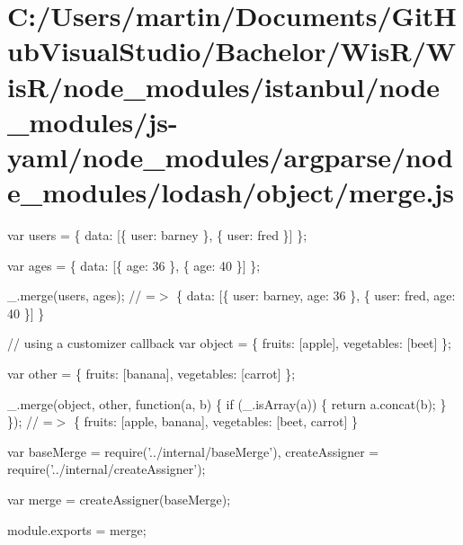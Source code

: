 \hypertarget{_c_1_2_users_2martin_2_documents_2_git_hub_visual_studio_2_bachelor_2_wis_r_2_wis_r_2node_modulebf1160bae7eb22fdbb16d729d621cb47}{}\section{C\+:/\+Users/martin/\+Documents/\+Git\+Hub\+Visual\+Studio/\+Bachelor/\+Wis\+R/\+Wis\+R/node\+\_\+modules/istanbul/node\+\_\+modules/js-\/yaml/node\+\_\+modules/argparse/node\+\_\+modules/lodash/object/merge.\+js}
var users = \{ \textquotesingle{}data\textquotesingle{}\+: \mbox{[}\{ \textquotesingle{}user\textquotesingle{}\+: \textquotesingle{}barney\textquotesingle{} \}, \{ \textquotesingle{}user\textquotesingle{}\+: \textquotesingle{}fred\textquotesingle{} \}\mbox{]} \};

var ages = \{ \textquotesingle{}data\textquotesingle{}\+: \mbox{[}\{ \textquotesingle{}age\textquotesingle{}\+: 36 \}, \{ \textquotesingle{}age\textquotesingle{}\+: 40 \}\mbox{]} \};

\+\_\+.\+merge(users, ages); // =$>$ \{ \textquotesingle{}data\textquotesingle{}\+: \mbox{[}\{ \textquotesingle{}user\textquotesingle{}\+: \textquotesingle{}barney\textquotesingle{}, \textquotesingle{}age\textquotesingle{}\+: 36 \}, \{ \textquotesingle{}user\textquotesingle{}\+: \textquotesingle{}fred\textquotesingle{}, \textquotesingle{}age\textquotesingle{}\+: 40 \}\mbox{]} \}

// using a customizer callback var object = \{ \textquotesingle{}fruits\textquotesingle{}\+: \mbox{[}\textquotesingle{}apple\textquotesingle{}\mbox{]}, \textquotesingle{}vegetables\textquotesingle{}\+: \mbox{[}\textquotesingle{}beet\textquotesingle{}\mbox{]} \};

var other = \{ \textquotesingle{}fruits\textquotesingle{}\+: \mbox{[}\textquotesingle{}banana\textquotesingle{}\mbox{]}, \textquotesingle{}vegetables\textquotesingle{}\+: \mbox{[}\textquotesingle{}carrot\textquotesingle{}\mbox{]} \};

\+\_\+.\+merge(object, other, function(a, b) \{ if (\+\_\+.\+is\+Array(a)) \{ return a.\+concat(b); \} \}); // =$>$ \{ \textquotesingle{}fruits\textquotesingle{}\+: \mbox{[}\textquotesingle{}apple\textquotesingle{}, \textquotesingle{}banana\textquotesingle{}\mbox{]}, \textquotesingle{}vegetables\textquotesingle{}\+: \mbox{[}\textquotesingle{}beet\textquotesingle{}, \textquotesingle{}carrot\textquotesingle{}\mbox{]} \}


\begin{DoxyCodeInclude}
var baseMerge = require(\textcolor{stringliteral}{'../internal/baseMerge'}),
    createAssigner = require(\textcolor{stringliteral}{'../internal/createAssigner'});

var merge = createAssigner(baseMerge);

module.exports = merge;
\end{DoxyCodeInclude}
 